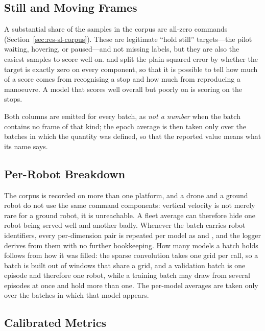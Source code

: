 \subsection{Still and Moving Frames}
\label{sec:metrics-still}

A substantial share of the samples in the corpus are all-zero commands
(Section~\ref{sec:res-sl-corpus}). These are legitimate ``hold still'' targets---the pilot waiting, hovering, or
paused---and not missing labels, but they are also the easiest samples to
score well on.  and  split the plain squared
error by whether the target is exactly zero on every component, so that it is
possible to tell how much of a score comes from recognising a stop and how
much from reproducing a manoeuvre. A model that scores well overall but poorly
on  is scoring on the stops.

Both columns are emitted for every batch, as \emph{not a number} when the
batch contains no frame of that kind; the epoch average is then taken only
over the batches in which the quantity was defined, so that the reported
value means what its name says.

\subsection{Per-Robot Breakdown}
\label{sec:metrics-per-robot}

The corpus is recorded on more than one platform, and a drone and a ground
robot do not use the same command components: vertical velocity is not merely
rare for a ground robot, it is unreachable. A fleet average can therefore
hide one robot being served well and another badly. Whenever the batch
carries robot identifiers, every per-dimension pair is repeated per model as
 and , and the logger derives
 from them with no further bookkeeping. How many models a
batch holds follows from how it was filled: the sparse convolution takes one
grid per call, so a batch is built out of windows that share a grid, and a
validation batch is one episode and therefore one robot, while a training
batch may draw from several episodes at once and hold more than one. The
per-model averages are taken only over the batches in which that model
appears.

\subsection{Calibrated Metrics}
\label{sec:metrics-calibrated}

